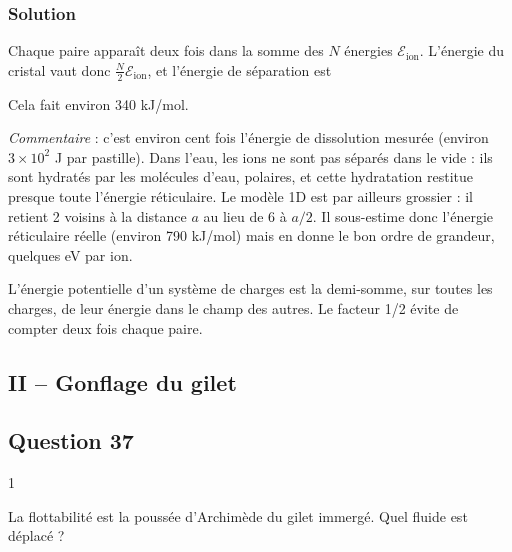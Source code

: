 \documentclass[11pt,a4paper]{article}
\newcommand{\equationajustee}[1]{%
  \sbox{\boiteequation}{$\displaystyle #1$}%
  \ifdim\wd\boiteequation>\linewidth
    \[\resizebox{\linewidth}{!}{\usebox{\boiteequation}}\]%
  \else
    \[#1\]%
  \fi}
\begin{document}
\hypertarget{solution-35}{%
\subsubsection{Solution}\label{solution-35}}

Chaque paire apparaît deux fois dans la somme des \(N\) énergies \(\mathcal E_{\text{ion}}\). L'énergie du cristal vaut donc \(\frac N2\mathcal E_{\text{ion}}\), et l'énergie de séparation est

\equationajustee{\mathcal E_{\text{\text{sép}}}=\frac N2\,\frac{e^2\ln2}{2\pi\varepsilon_0a}}

\equationajustee{\boxed{\mathcal E_{\text{\text{sép}}}\approx2{,}9\times10^4\ \text{J}}}

Cela fait environ 340 kJ/mol.

\emph{Commentaire} : c'est environ cent fois l'énergie de dissolution mesurée (environ \(3\times10^2\) J par pastille). Dans l'eau, les ions ne sont pas séparés dans le vide : ils sont hydratés par les molécules d'eau, polaires, et cette hydratation restitue presque toute l'énergie réticulaire. Le modèle 1D est par ailleurs grossier : il retient 2 voisins à la distance \(a\) au lieu de 6 à \(a/2\). Il sous-estime donc l'énergie réticulaire réelle (environ 790 kJ/mol) mais en donne le bon ordre de grandeur, quelques eV par ion.

\begin{methode}

L'énergie potentielle d'un système de charges est la demi-somme, sur toutes les charges, de leur énergie dans le champ des autres. Le facteur 1/2 évite de compter deux fois chaque paire.

\end{methode}

\hypertarget{ii-gonflage-du-gilet}{%
\subsection{II -- Gonflage du gilet}\label{ii-gonflage-du-gilet}}

\hypertarget{question-37}{%
\subsection{Question 37}\label{question-37}}

\begin{indication}{1}

La flottabilité est la poussée d'Archimède du gilet immergé. Quel fluide est déplacé ?

\end{indication}
\end{document}
